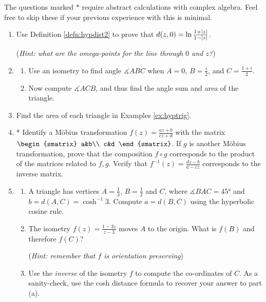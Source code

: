 \begin{exercises}
	The questions marked $*$ require abstract calculations with complex algebra. Feel free to skip these if your previous experience with this is minimal.
	\begin{enumerate}
	  \item Use Definition \ref{defn:hypdist2} to prove that $d(z,0)=\ln\frac{1+\left| z\right|}{1-\left| z\right|}$.\par
	  (\emph{Hint: what are the omega-points for the line through $0$ and $z$?})
	  
	  
	  \item\begin{enumerate}
	    \item Use an isometry to find angle $\measuredangle ABC$ when $A=0$, $B=\frac i2$, and $C=\frac{1+i}2$.
	    \item Now compute $\measuredangle ACB$, and thus find the angle sum and area of the triangle.
	  \end{enumerate} 
	  
 		
 		\item Find the area of each triangle in Examples \ref{ex:hyptrig}.
	
		
	
	  \item* Identify a Möbius transformation $f(z)=\frac{az+b}{cz+d}$ with the matrix
	  $\begin{smatrix}
	  	a&b\\
	  	c&d
	  \end{smatrix}$.
	  If $g$ is another Möbius transformation, prove that the composition $f\circ g$ corresponds to the product of the matrices related to $f,g$. Verify that $f^{-1}(z)=\frac{dz-b}{a-cz}$ corresponds to the inverse matrix.\footnotemark{}
	  
	  
	  \item\begin{enumerate}
	    \item A triangle has vertices $A=\frac 13$, $B=\frac 12$ and $C$, where $\measuredangle{BAC}=\ang{45}$ and $b=d(A,C)=\cosh^{-1}3$. Compute $a=d(B,C)$ using the hyperbolic cosine rule.
	    
	    \item The isometry $f(z)=\frac{1-3z}{z-3}$ moves $A$ to the origin. What is $f(B)$ and therefore $f(C)$?\par
	   	(\emph{Hint: remember that $f$ is orientation preserving})
	    
	    \item Use the \emph{inverse} of the isometry $f$ to compute the co-ordinates of $C$. As a sanity-check, use the cosh distance formula to recover your answer to part (a).    
	  \end{enumerate}
	  

\end{enumerate}
\end{exercises}
